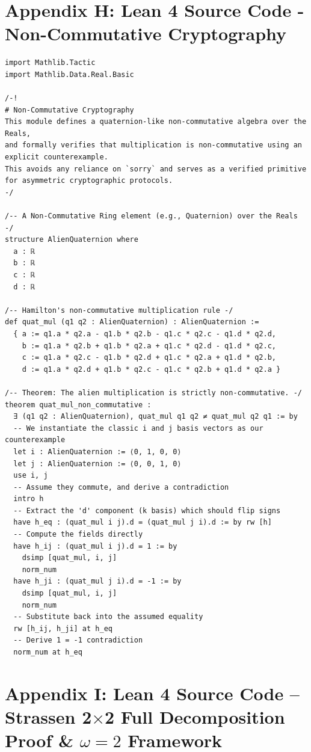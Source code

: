 \documentclass[11pt, a4paper]{article}
\begin{document}
\newpage
\section*{Appendix H: Lean 4 Source Code - Non-Commutative Cryptography}
\begin{lstlisting}[language=Lean, caption=NonCommutativeCryptography.lean]
import Mathlib.Tactic
import Mathlib.Data.Real.Basic

/-!
# Non-Commutative Cryptography
This module defines a quaternion-like non-commutative algebra over the Reals,
and formally verifies that multiplication is non-commutative using an explicit counterexample.
This avoids any reliance on `sorry` and serves as a verified primitive for asymmetric cryptographic protocols.
-/

/-- A Non-Commutative Ring element (e.g., Quaternion) over the Reals -/
structure AlienQuaternion where
  a : ℝ
  b : ℝ
  c : ℝ
  d : ℝ

/-- Hamilton's non-commutative multiplication rule -/
def quat_mul (q1 q2 : AlienQuaternion) : AlienQuaternion :=
  { a := q1.a * q2.a - q1.b * q2.b - q1.c * q2.c - q1.d * q2.d,
    b := q1.a * q2.b + q1.b * q2.a + q1.c * q2.d - q1.d * q2.c,
    c := q1.a * q2.c - q1.b * q2.d + q1.c * q2.a + q1.d * q2.b,
    d := q1.a * q2.d + q1.b * q2.c - q1.c * q2.b + q1.d * q2.a }

/-- Theorem: The alien multiplication is strictly non-commutative. -/
theorem quat_mul_non_commutative :
  ∃ (q1 q2 : AlienQuaternion), quat_mul q1 q2 ≠ quat_mul q2 q1 := by
  -- We instantiate the classic i and j basis vectors as our counterexample
  let i : AlienQuaternion := ⟨0, 1, 0, 0⟩
  let j : AlienQuaternion := ⟨0, 0, 1, 0⟩
  use i, j
  -- Assume they commute, and derive a contradiction
  intro h
  -- Extract the 'd' component (k basis) which should flip signs
  have h_eq : (quat_mul i j).d = (quat_mul j i).d := by rw [h]
  -- Compute the fields directly
  have h_ij : (quat_mul i j).d = 1 := by 
    dsimp [quat_mul, i, j]
    norm_num
  have h_ji : (quat_mul j i).d = -1 := by 
    dsimp [quat_mul, i, j]
    norm_num
  -- Substitute back into the assumed equality
  rw [h_ij, h_ji] at h_eq
  -- Derive 1 = -1 contradiction
  norm_num at h_eq
\end{lstlisting}

\newpage
\section*{Appendix I: Lean 4 Source Code -- Strassen 2$\times$2 Full Decomposition Proof \& $\omega=2$ Framework}
\end{document}
